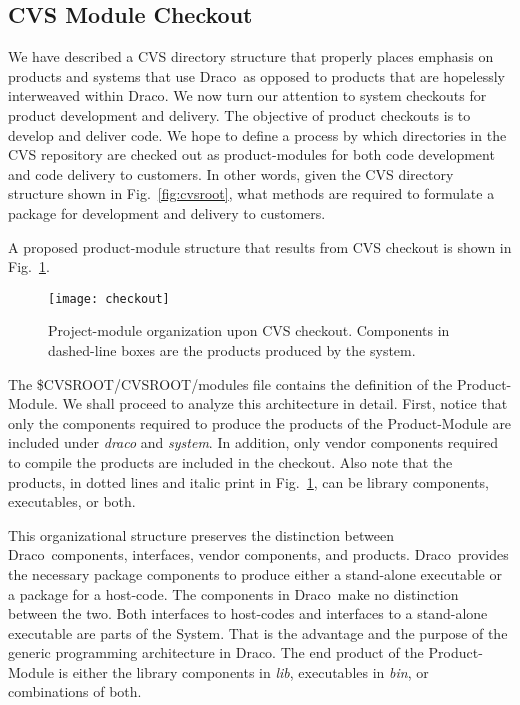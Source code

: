 \documentclass[note]{ResearchNote_pdf}
\newcommand{\draco}{\textsf{Draco}}
\newcommand{\pkg}[1]{\textsf{#1}}
\newcommand{\dir}[1]{\textsl{#1}}
\begin{document}
\subsection{CVS Module Checkout}

We have described a CVS directory structure that properly places
emphasis on products and systems that use \draco\ as opposed to
products that are hopelessly interweaved within \draco.  We now turn
our attention to system checkouts for product development and
delivery.  The objective of product checkouts is to develop and
deliver code.  We hope to define a process by which directories in
the CVS repository are checked out as product-modules for both code
development and code delivery to customers.  In other words, given the
CVS directory structure shown in Fig.~\ref{fig:cvsroot}, what methods
are required to formulate a package for development and delivery to
customers.

A proposed product-module structure that results from CVS
checkout is shown in Fig.~\ref{fig:checkout}.
\begin{figure}
  \centerline{\texttt{[image: checkout]}}
  \caption{Project-module organization upon CVS checkout.  Components
    in dashed-line boxes are the products produced by the system.}
  \label{fig:checkout}
\end{figure}
The \pkg{\$CVSROOT/CVSROOT/modules} file contains the definition of
the \pkg{Product-Module}.  We shall proceed to analyze this
architecture in detail.  First, notice that only the components
required to produce the products of the \pkg{Product-Module} are
included under \dir{draco} and \dir{system}.  In addition, only vendor
components required to compile the products are included in the
checkout.  Also note that the products, in dotted lines and italic
print in Fig.~\ref{fig:checkout}, can be library components,
executables, or both.

This organizational structure preserves the distinction between
\draco\ components, interfaces, vendor components, and products.
\draco\ provides the necessary package components to produce either a
stand-alone executable or a package for a host-code.  The components
in \draco\ make no distinction between the two.  Both interfaces to
host-codes and interfaces to a stand-alone executable are parts of the
\pkg{System}.  That is the advantage and the purpose of the generic
programming architecture in \draco.  The end product of the
\pkg{Product-Module} is either the library components in \dir{lib},
executables in \dir{bin}, or combinations of both.
\end{document}
